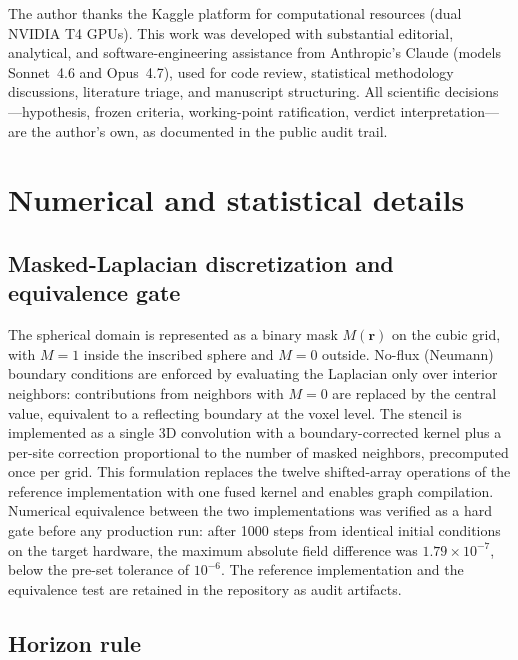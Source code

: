 \documentclass[aps,pre,preprint,superscriptaddress,nofootinbib,floatfix]{revtex4-2}
\begin{document}
\begin{acknowledgments}
The author thanks the Kaggle platform for computational resources (dual NVIDIA T4 GPUs). This work was developed with substantial editorial, analytical, and software-engineering assistance from Anthropic's Claude (models Sonnet~4.6 and Opus~4.7), used for code review, statistical methodology discussions, literature triage, and manuscript structuring. All scientific decisions---hypothesis, frozen criteria, working-point ratification, verdict interpretation---are the author's own, as documented in the public audit trail.
\end{acknowledgments}

\appendix

\section{Numerical and statistical details}
\label{app:laplacian}

\subsection{Masked-Laplacian discretization and equivalence gate}

The spherical domain is represented as a binary mask $M(\mathbf{r})$ on the cubic grid, with $M=1$ inside the inscribed sphere and $M=0$ outside. No-flux (Neumann) boundary conditions are enforced by evaluating the Laplacian only over interior neighbors: contributions from neighbors with $M=0$ are replaced by the central value, equivalent to a reflecting boundary at the voxel level. The stencil is implemented as a single 3D convolution with a boundary-corrected kernel plus a per-site correction proportional to the number of masked neighbors, precomputed once per grid. This formulation replaces the twelve shifted-array operations of the reference implementation with one fused kernel and enables graph compilation. Numerical equivalence between the two implementations was verified as a hard gate before any production run: after 1000 steps from identical initial conditions on the target hardware, the maximum absolute field difference was $1.79\times10^{-7}$, below the pre-set tolerance of $10^{-6}$. The reference implementation and the equivalence test are retained in the repository as audit artifacts.

\subsection{Horizon rule}
\end{document}
